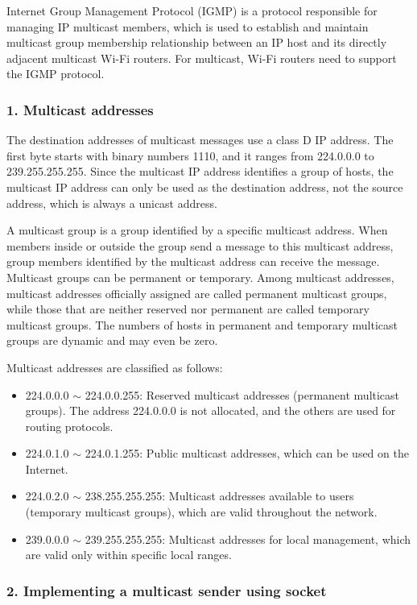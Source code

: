 \documentclass[a4paper,12pt]{book}
\begin{document}
Internet Group Management Protocol (IGMP) is a protocol responsible for managing IP multicast members, which is used to establish and maintain multicast group membership relationship between an IP host and its directly adjacent multicast Wi-Fi routers. For multicast, Wi-Fi routers need to support the IGMP protocol.

\subsubsection{1. Multicast addresses}
The destination addresses of multicast messages use a class D IP address. The first byte starts with binary numbers 1110, and it ranges from 224.0.0.0 to 239.255.255.255. Since the multicast IP address identifies a group of hosts, the multicast IP address can only be used as the destination address, not the source address, which is always a unicast address.

A multicast group is a group identified by a specific multicast address. When members inside or outside the group send a message to this multicast address, group members identified by the multicast address can receive the message. Multicast groups can be permanent or temporary. Among multicast addresses, multicast addresses officially assigned are called permanent multicast groups, while those that are neither reserved nor permanent are called temporary multicast groups. The numbers of hosts in permanent and temporary multicast groups are dynamic and may even be zero.

Multicast addresses are classified as follows:

\begin{itemize}[leftmargin=1.5em,noitemsep]
    \item 224.0.0.0 $\sim$ 224.0.0.255: Reserved multicast addresses (permanent multicast groups). The address 224.0.0.0 is not allocated, and the others are used for routing protocols.
    \item 224.0.1.0 $\sim$ 224.0.1.255: Public multicast addresses, which can be used on the Internet.
    \item 224.0.2.0 $\sim$ 238.255.255.255: Multicast addresses available to users (temporary multicast groups), which are valid throughout the network.
    \item 239.0.0.0 $\sim$ 239.255.255.255: Multicast addresses for local management, which are valid only within specific local ranges.
\end{itemize}

\subsubsection{2. Implementing a multicast sender using socket}
\end{document}
